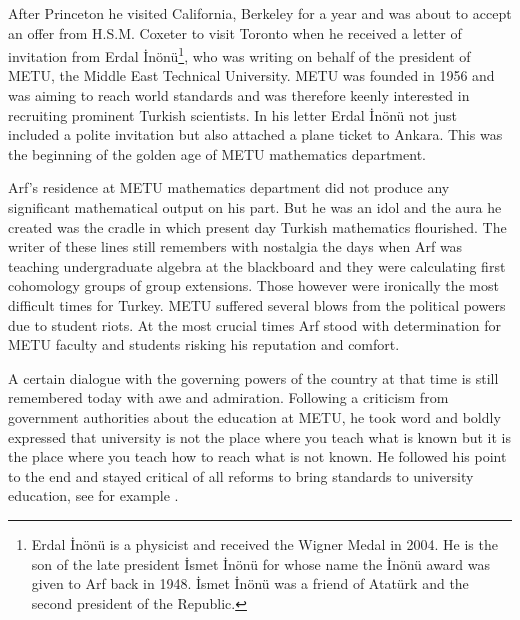 \documentclass[12pt]{amsart}
\begin{document}
After Princeton he visited California, Berkeley for a year and was about to accept an offer from H.S.M. Coxeter to visit Toronto when he received a letter of invitation from Erdal {\.I}n\"{o}n\"{u}\footnote{Erdal {\.I}n\"{o}n\"{u} is a physicist and received the Wigner Medal in 2004. He is the son of the late president {\.I}smet {\.I}n\"{o}n\"{u} for whose name the {\.I}n\"{o}n\"{u} award was given to Arf back in 1948. {\.I}smet {\.I}n\"{o}n\"{u} was a friend of Atat\"{u}rk and the second president of the Republic.},  who was writing on behalf of the  president of METU, the Middle East Technical University. METU was founded in 1956 and was aiming to reach world standards and was therefore keenly interested in recruiting prominent Turkish scientists. In his letter Erdal {\.I}n\"{o}n\"{u} not just included a polite invitation but also attached a plane ticket to Ankara. This was the beginning of the golden age of METU mathematics department.

Arf's residence at METU mathematics department did not produce any significant mathematical output on his part. But he was an idol and the aura he created was the cradle in which present day Turkish mathematics flourished. The writer of these lines still remembers with nostalgia the days when Arf was teaching undergraduate algebra at the blackboard and they were calculating first cohomology groups of group extensions.
Those however were ironically the most difficult times for Turkey. METU suffered several blows from the political powers due to student riots.  At the most crucial times Arf stood with determination for METU faculty and students risking his reputation and comfort.

A certain dialogue with the governing powers of the country at that time is still remembered today with awe and admiration. Following a criticism from government authorities about the education at METU,  he took word and boldly expressed that university is not the place where you teach what is known but it is the place where you teach how to reach what is not known. He followed his point to the end and stayed critical of all reforms to bring standards to university education, see for example \cite{arf-yok}.
\end{document}
